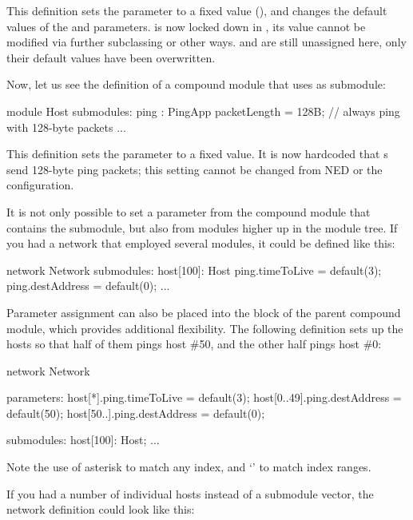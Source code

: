 This definition sets the  parameter to a fixed value
(), and changes the default values of the
 and  parameters.  is now
locked down in , its value cannot be modified via further subclassing
or other ways.  and  are still unassigned
here, only their default values have been overwritten.

Now, let us see the definition of a  compound module that uses
 as submodule:

\begin{ned}
module Host
{
    submodules:
        ping : PingApp {
            packetLength = 128B; // always ping with 128-byte packets
        }
        ...
}
\end{ned}

This definition sets the  parameter to a fixed value. It
is now hardcoded that s send 128-byte ping packets; this
setting cannot be changed from NED or the configuration.

It is not only possible to set a parameter from the compound module that
contains the submodule, but also from modules higher up in the module tree.
If you had a network that employed several  modules, it could be
defined like this:

\begin{ned}
network Network
{
    submodules:
        host[100]: Host {
            ping.timeToLive = default(3);
            ping.destAddress = default(0);
        }
        ...
}
\end{ned}

Parameter assignment can also be placed into the  block of
the parent compound module, which provides additional flexibility. The
following definition sets up the hosts so that half of them pings host \#50,
and the other half pings host \#0:

\begin{ned}
network Network
{
    parameters:
        host[*].ping.timeToLive = default(3);
        host[0..49].ping.destAddress = default(50);
        host[50..].ping.destAddress = default(0);

    submodules:
        host[100]: Host;
        ...
}
\end{ned}

Note the use of asterisk to match any index, and `' to match index ranges.

If you had a number of individual hosts instead of a submodule vector,
the network definition could look like this:

